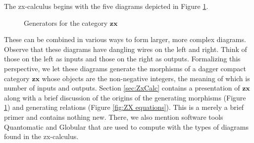 \documentclass[a4paper,UKenglish]{lipics-v2016}
\begin{document}
The zx-calculus begins with the five diagrams depicted in Figure \ref{fig:ZX generators}.
\begin{figure}
	\caption{Generators for the category $\mathbf{zx}$}
	\label{fig:ZX generators}
\end{figure}
These can be combined in various ways to form larger, more complex diagrams.   Observe that these diagrams have dangling wires on the left and right. Think of those on the left as inputs and those on the right as outputs.  Formalizing this perspective, we let these diagrams generate the morphisms of a dagger compact category $\mathbf{zx}$ whose objects are the non-negative integers, the meaning of which is number of inputs and outputs.  Section \ref{sec:ZxCalc} contains a presentation of $\mathbf{zx}$ along with a brief discussion of the origins of the generating morphisms (Figure \ref{fig:ZX generators}) and generating relations (Figure \ref{fig:ZX equations}). This is a merely a brief primer and contains nothing new.  There, we also mention software tools Quantomatic \cite{BarKissingerVicary_Globular,DixonDuncanKissinger_QuantomaticWebsite} and Globular \cite{BarKissingerVicary_Globular} that are used to compute with the types of diagrams found in the zx-calculus.  
\end{document}
